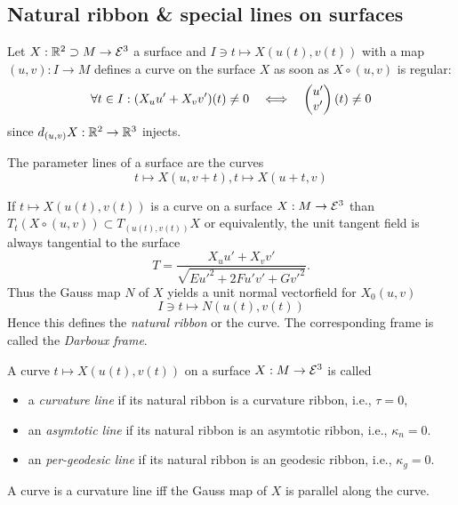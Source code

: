 \subsection{Natural ribbon \& special lines on surfaces}

\begin{definition}
	Let $X: \mathbb R^2 \supset M \to \mathcal E^3$ a surface and $I \ni t \mapsto X(u(t),v(t))$ with a map $(u,v):I \to M$ defines a curve on the surface $X$ as soon as $X \circ (u,v)$ is regular:
		\[ \forall t \in I: (X_uu' + X_vv') (t) \neq 0 \quad \Longleftrightarrow \quad
			\begin{pmatrix} u'\\v' \end{pmatrix}(t) \neq 0 \]
	since $d_{(u,v)} X: \mathbb R^2 \to \mathbb R^3$ injects.
\end{definition}

\begin{example}
	The parameter lines of a surface are the curves
		\[ t \mapsto X(u,v+t), t \mapsto X(u+t,v) \]
\end{example}

\begin{remark} %
	If $t \mapsto X(u(t),v(t))$ is a curve on a surface $X: M \to \mathcal E^3$ than $T_t(X \circ (u,v)) \subset T_{(u(t),v(t))}X$
	or equivalently, the unit tangent field is always tangential to the surface
		\[ T= \frac {X_uu' + X_vv'}{\sqrt{Eu'^2 + 2Fu'v' + Gv'^2}}. \]
	Thus the Gauss map $N$ of $X$ yields a unit normal vectorfield for $X_0(u,v)$ 
		\[ I \ni t \mapsto N(u(t),v(t)) \]
	Hence this defines the \emph{natural ribbon} or the curve. The corresponding frame is called the \emph{Darboux frame}.
\end{remark}

\begin{definition}
	A curve $t \mapsto X(u(t),v(t))$ on a surface $X: M \to \mathcal E^3$ is called
	\begin{itemize}
		\item a \emph{curvature line} if its natural ribbon is a curvature ribbon, i.e., $\tau = 0$,
		\item  an \emph{asymtotic line} if its natural ribbon is an asymtotic ribbon, i.e., $\kappa_n = 0$.
		\item  an \emph{per-geodesic line} if its natural ribbon is an geodesic ribbon, i.e., $\kappa_g = 0$.
	\end{itemize}
\end{definition}

\begin{remark}
	A curve is a curvature line iff the Gauss map of $X$ is parallel along the curve.
\end{remark}

